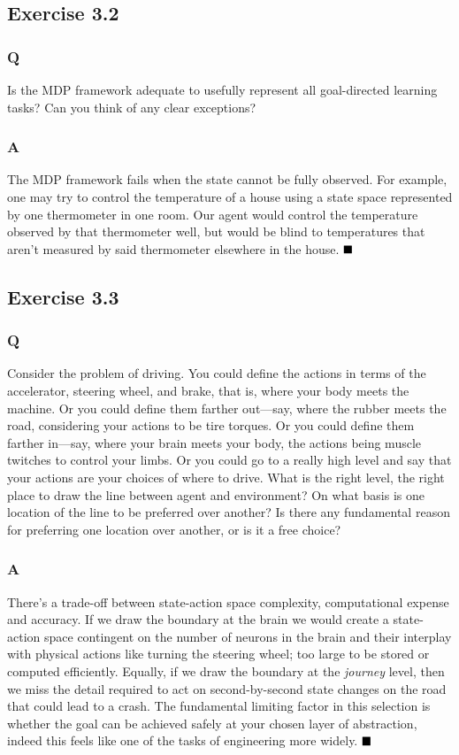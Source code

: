 \subsection{Exercise 3.2}
\subsubsection*{Q}
Is the MDP framework adequate to usefully represent all goal-directed learning tasks? Can you think of any clear exceptions? 

\subsubsection*{A}
The MDP framework fails when the state cannot be fully observed. For example, one may try to control the temperature of a house using a state space represented by one thermometer in one room. Our agent would control the temperature observed by that thermometer well, but would be blind to temperatures that aren't measured by said thermometer elsewhere in the house.
$
\hfill \blacksquare
$

\subsection{Exercise 3.3}
\subsubsection*{Q}
Consider the problem of driving. You could define the actions in terms of the accelerator, steering wheel, and brake, that is, where your body meets the machine. Or you could define them farther out—say, where the rubber meets the road, considering your actions to be tire torques. Or you could define them farther in—say, where your brain meets your body, the actions being muscle twitches to control your limbs. Or you could go to a really high level and say that your actions are your choices of where to drive. What is the right level, the right place to draw the line between agent and environment? On what basis is one location of the line to be preferred over another? Is there any fundamental reason for preferring one location over another, or is it a free choice?

\subsubsection*{A}
There's a trade-off between state-action space complexity, computational expense and accuracy. If we draw the boundary at the brain we would create a state-action space contingent on the number of neurons in the brain and their interplay with physical actions like turning the steering wheel; too large to be stored or computed efficiently. Equally, if we draw the boundary at the \textit{journey} level, then we miss the detail required to act on second-by-second state changes on the road that could lead to a crash. The fundamental limiting factor in this selection is whether the goal can be achieved safely at your chosen layer of abstraction, indeed this feels like one of the tasks of engineering more widely.
$
\hfill \blacksquare
$

